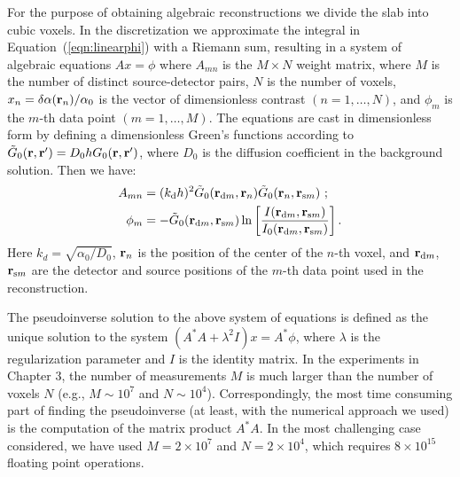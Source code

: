 For the purpose of obtaining algebraic reconstructions we divide the slab into cubic voxels. In the discretization we approximate the integral in Equation~(\ref{eqn:linearphi}) with a Riemann sum, resulting in a system of algebraic equations $Ax=\phi$ where $A_{mn}$ is the $M\times N$ weight matrix, where $M$ is the number of distinct source-detector pairs, $N$ is the number of voxels, $x_n = \delta\alpha(\mathbf{r}_n) / \alpha_0$ is the vector of dimensionless contrast $(n=1,\dots,N)$, and $\phi_m$ is the $m$-th data point $(m=1,\dots,M)$.  The equations are cast in dimensionless form by defining a dimensionless Green's functions according to $\tilde{G}_0(\mathbf{r}, \mathbf{r}^\prime) = D_0 h G_0(\mathbf{r}, \mathbf{r}^\prime)$, where $D_0$ is the diffusion coefficient in the background solution. Then we have:
%
\begin{align}
\label{eq6}
A_{mn} &= (k_{\rm d} h)^2 \tilde{G}_0(\mathbf{r}_{{\rm d}m}, \mathbf{r}_n) \tilde{G}_0(\mathbf{r}_n, \mathbf{r}_{{\rm s}m}) \ ; \\
\phi_m &= -\tilde{G}_0(\mathbf{r}_{{\rm d}m}, \mathbf{r}_{{\rm s}m}) \ln\left[\frac{I(\mathbf{r}_{{\rm d}m}, \mathbf{r}_{{\rm s}m})} {I_0(\mathbf{r}_{{\rm d}m}, \mathbf{r}_{{\rm s}m})}\right] .
\end{align}
%
\noindent
Here $k_d=\sqrt{\alpha_0/D_0}$, $\mathbf{r}_n$ is the position of the center of the $n$-th voxel, and $\mathbf{r}_{{\rm d}m}$, $\mathbf{r}_{{\rm s}m}$ are the detector and source positions of the $m$-th data point used in the reconstruction.

The pseudoinverse solution to the above system of equations is defined as the unique solution to the system $(A^*A + \lambda^2 I)x = A^*\phi$, where $\lambda$ is the regularization parameter and $I$ is the identity matrix. In the experiments in Chapter 3, the number of measurements $M$ is much larger than the number of voxels $N$ (e.g., $M\sim 10^7$ and $N\sim 10^4$). Correspondingly, the most time consuming part of finding the pseudoinverse (at least, with the numerical approach we used) is the computation of the matrix product $A^*A$. In the most challenging case considered, we have used $M=2\times 10^7$ and $N=2\times 10^4$, which requires $8\times 10^{15}$ floating point operations. 


